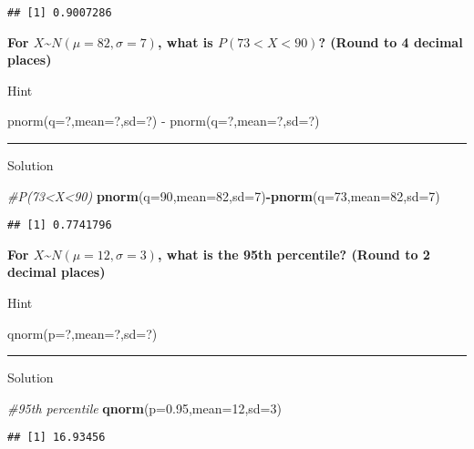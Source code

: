 \documentclass[
]{book}
\newenvironment{Shaded}{\begin{snugshade}}{\end{snugshade}}
\newcommand{\AttributeTok}[1]{\textcolor[rgb]{0.13,0.29,0.53}{#1}}
\newcommand{\CommentTok}[1]{\textcolor[rgb]{0.56,0.35,0.01}{\textit{#1}}}
\newcommand{\DecValTok}[1]{\textcolor[rgb]{0.00,0.00,0.81}{#1}}
\newcommand{\FloatTok}[1]{\textcolor[rgb]{0.00,0.00,0.81}{#1}}
\newcommand{\FunctionTok}[1]{\textcolor[rgb]{0.13,0.29,0.53}{\textbf{#1}}}
\newcommand{\NormalTok}[1]{#1}
\newcommand{\SpecialCharTok}[1]{\textcolor[rgb]{0.81,0.36,0.00}{\textbf{#1}}}
\begin{document}
\begin{verbatim}
## [1] 0.9007286
\end{verbatim}

\textbf{For \(X\)\textasciitilde{}\(N(\mu=82,\sigma=7)\), what is \(P(73<X<90)\)? (Round to 4 decimal places)}

Hint

pnorm(q=?,mean=?,sd=?) - pnorm(q=?,mean=?,sd=?)

\begin{center}\rule{0.5\linewidth}{0.5pt}\end{center}

Solution

\begin{Shaded}
\begin{Highlighting}[]
\CommentTok{\#P(73\textless{}X\textless{}90)}
\FunctionTok{pnorm}\NormalTok{(}\AttributeTok{q=}\DecValTok{90}\NormalTok{,}\AttributeTok{mean=}\DecValTok{82}\NormalTok{,}\AttributeTok{sd=}\DecValTok{7}\NormalTok{)}\SpecialCharTok{{-}}\FunctionTok{pnorm}\NormalTok{(}\AttributeTok{q=}\DecValTok{73}\NormalTok{,}\AttributeTok{mean=}\DecValTok{82}\NormalTok{,}\AttributeTok{sd=}\DecValTok{7}\NormalTok{)}
\end{Highlighting}
\end{Shaded}

\begin{verbatim}
## [1] 0.7741796
\end{verbatim}

\textbf{For \(X\)\textasciitilde{}\(N(\mu=12,\sigma=3)\), what is the 95th percentile? (Round to 2 decimal places)}

Hint

qnorm(p=?,mean=?,sd=?)

\begin{center}\rule{0.5\linewidth}{0.5pt}\end{center}

Solution

\begin{Shaded}
\begin{Highlighting}[]
\CommentTok{\#95th percentile}
\FunctionTok{qnorm}\NormalTok{(}\AttributeTok{p=}\FloatTok{0.95}\NormalTok{,}\AttributeTok{mean=}\DecValTok{12}\NormalTok{,}\AttributeTok{sd=}\DecValTok{3}\NormalTok{)}
\end{Highlighting}
\end{Shaded}

\begin{verbatim}
## [1] 16.93456
\end{verbatim}
\end{document}
